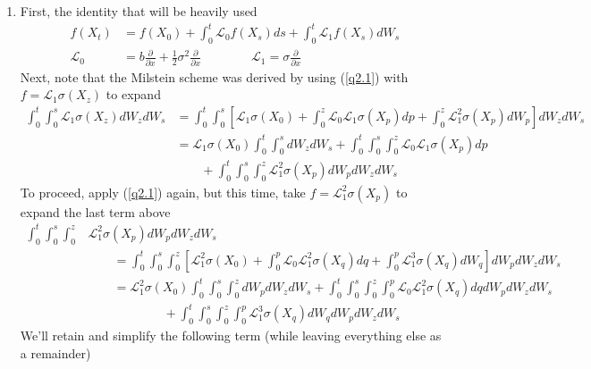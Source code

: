 \documentclass[12pt]{article}
\theoremstyle{plain}
\theoremstyle{definition}
\theoremstyle{remark}
\begin{document}
\begin{enumerate}
  \item %
    First, the identity that will be heavily used
    \begin{align}
      f(X_t) &= f(X_0) + \int^t_0 \mathscr{L}_0 f(X_s) ds
      +\int^t_0 \mathscr{L}_1 f(X_s) dW_s
      \label{q2.1}\\
      \mathscr{L}_0
        &= b\frac{\partial}{\partial x}
          +\frac{1}{2}\sigma^2\frac{\partial}{\partial x}
        \qquad\qquad
      \mathscr{L}_1 = \sigma \frac{\partial}{\partial x}
    \end{align}
    Next, note that the Milstein scheme was derived by using
    (\ref{q2.1}) with $f=\mathscr{L}_1\sigma(X_z)$ to expand
    \begin{align*}
      \int^t_0\int^s_0\mathscr{L}_1\sigma(X_z)dW_zdW_s
      &= \int^t_0\int^s_0
      \left[
        \mathscr{L}_1\sigma(X_0)
        + \int^z_0 \mathscr{L}_0\mathscr{L}_1\sigma(X_p) dp
        + \int^z_0 \mathscr{L}^2_1\sigma(X_p) dW_p
      \right]
      dW_z dW_s\\
      &= \mathscr{L}_1\sigma(X_0)\int^t_0\int^s_0  dW_z dW_s+
      \int^t_0\int^s_0\int^z_0
        \mathscr{L}_0\mathscr{L}_1\sigma(X_p) dp\\
      &\qquad
        + \int^t_0\int^s_0 \int^z_0
            \mathscr{L}^2_1\sigma(X_p) dW_p dW_z dW_s
    \end{align*}
    To proceed, apply (\ref{q2.1}) again, but this time, take
    $f=\mathscr{L}_1^2\sigma(X_p)$ to expand the last term above
    \begin{align*}
        \int^t_0\int^s_0 \int^z_0
          &\mathscr{L}^2_1\sigma(X_p) dW_p dW_z dW_s\\
      &\qquad =
        \int^t_0\int^s_0 \int^z_0
        \left[
          \mathscr{L}^2_1\sigma(X_0)
          +\int^p_0 \mathscr{L}_0 \mathscr{L}^2_1\sigma(X_q) dq
          +\int^p_0 \mathscr{L}^3_1\sigma(X_q) dW_q
        \right]
        dW_p dW_z dW_s\\
      &\qquad =
        \mathscr{L}^2_1\sigma(X_0) \int^t_0\int^s_0 \int^z_0 dW_p dW_z dW_s
          + \int^t_0\int^s_0 \int^z_0\int^p_0
            \mathscr{L}_0 \mathscr{L}^2_1\sigma(X_q)
          dq dW_p dW_z dW_s\\
      &\qquad\qquad\qquad
          + \int^t_0\int^s_0 \int^z_0\int^p_0
            \mathscr{L}^3_1\sigma(X_q) dW_q
            dW_p dW_z dW_s
    \end{align*}
    We'll retain and simplify the following term (while leaving
    everything else as a remainder)
    \begin{align*}

\end{align*}
\end{enumerate}
\end{document}
